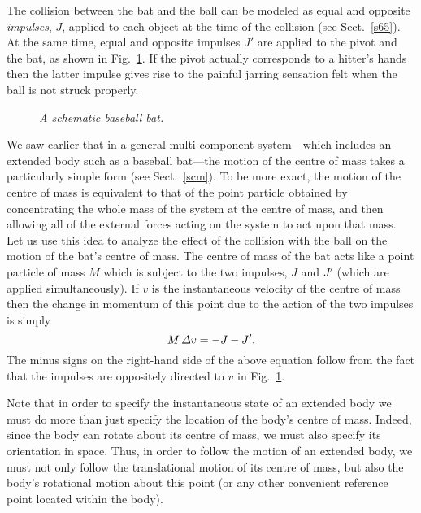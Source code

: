 The collision between the bat and the ball can be modeled as equal and opposite {\em impulses}, $J$,
applied to each object at the time of the  collision (see Sect.~\ref{s65}). At the same time,
equal and opposite impulses $J'$ are applied to the pivot and the bat,
as shown in Fig.~\ref{f83}. If the pivot  actually corresponds to
a hitter's hands then the latter
impulse gives rise to the painful jarring sensation felt when the ball is not struck
properly.

\begin{figure}
\epsfysize=3in
\centerline{}
\caption{\em A schematic baseball bat.}\label{f83}  
\end{figure}

We saw earlier that in a general multi-component system---which includes an extended
body such as a baseball bat---the motion of the
centre of mass takes a particularly simple form (see Sect.~\ref{scm}).
To be more exact, the motion of the centre of mass is equivalent to that
of the point particle obtained by concentrating the whole mass of the system at the centre of mass, and
then
allowing all of the external forces acting on the system to act upon that mass. Let us
use this idea to analyze the effect of the collision with the ball on the motion
of the bat's centre of mass. The centre of mass of the bat acts like a
point particle of mass $M$ which is subject to the two impulses, $J$ and $J'$ (which
are applied simultaneously). If $v$ is the instantaneous velocity of the centre
of mass then the change in momentum of this point due to the action
of the two impulses is simply
\begin{equation}\label{ebata2}
M\,{\mit\Delta} v = -J - J'.
\end{equation}
The minus signs on the right-hand side of the above equation follow
from the fact that the impulses are oppositely directed to $v$ in Fig.~\ref{f83}.

Note that in order to specify the instantaneous state of an extended body
we must do more than just specify the location of the body's centre of mass.
Indeed, since the body can rotate about its centre of mass, we must also specify
its orientation in space. Thus, in order to follow the motion of an extended body,
we must not only follow the translational motion of its centre of mass, but also
the body's rotational motion about this point (or any other convenient reference point
located within the body).

